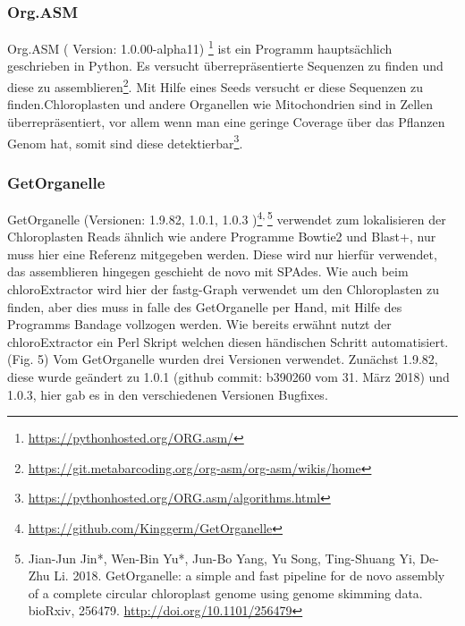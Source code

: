 \documentclass{scrartcl}
\begin{document}
\subsubsection{Org.ASM}
\label{sec-2-5-4}
Org.ASM ( Version: 1.0.00-alpha11) \footnote{\url{https://pythonhosted.org/ORG.asm/}} ist ein Programm hauptsächlich geschrieben in Python. Es versucht überrepräsentierte Sequenzen zu finden und diese zu assemblieren\footnote{\url{https://git.metabarcoding.org/org-asm/org-asm/wikis/home}}. 
Mit Hilfe eines Seeds versucht er diese Sequenzen zu finden.Chloroplasten und andere Organellen wie Mitochondrien sind in Zellen überrepräsentiert, vor allem
wenn man eine geringe Coverage über das Pflanzen Genom hat, somit sind diese detektierbar\footnote{\url{https://pythonhosted.org/ORG.asm/algorithms.html}}.
\subsubsection{GetOrganelle}
\label{sec-2-5-5}
GetOrganelle (Versionen: 1.9.82, 1.0.1, 1.0.3 )\footnote{\url{https://github.com/Kinggerm/GetOrganelle}}\textsuperscript{,}\,\footnote{Jian-Jun Jin*, Wen-Bin Yu*, Jun-Bo Yang, Yu Song, Ting-Shuang Yi, De-Zhu Li. 2018. GetOrganelle: a simple and fast pipeline for de novo assembly of a complete circular chloroplast genome using genome skimming data. bioRxiv, 256479. \url{http://doi.org/10.1101/256479}} verwendet zum lokalisieren der Chloroplasten Reads ähnlich wie andere Programme Bowtie2 \footnotemark[18]{} und Blast+, nur muss hier eine Referenz mitgegeben werden. 
Diese wird nur hierfür
verwendet, das assemblieren hingegen geschieht de novo mit SPAdes. Wie auch beim chloroExtractor wird hier der fastg-Graph verwendet um den Chloroplasten zu finden, aber dies muss in falle 
des GetOrganelle per Hand, mit Hilfe des Programms Bandage vollzogen werden. Wie bereits erwähnt nutzt der chloroExtractor ein Perl Skript welchen diesen händischen Schritt automatisiert.(Fig. 5) 
Vom GetOrganelle wurden drei Versionen verwendet. Zunächst 1.9.82, diese wurde geändert zu 1.0.1 (github commit: b390260 vom 31. März 2018) und 1.0.3, hier gab es in den verschiedenen Versionen Bugfixes.
\end{document}
